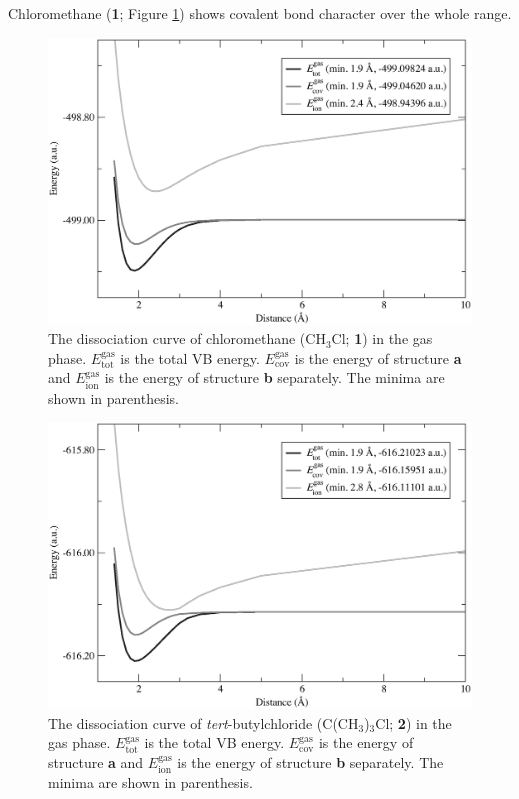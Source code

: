 Chloromethane (\textbf{1}; Figure \ref{ch3.fig.ch3cl}) shows covalent bond character over the whole range. 
\begin{figure}[htbp]
\begin{center}
\includegraphics[scale=0.55]{dissociation/figures/ch3cl_g.eps}
\end{center}
\caption{The dissociation curve of chloromethane (CH$_3$Cl; \textbf{1}) in the gas phase. $E_\mathrm{tot}^\mathrm{gas}$ is the total VB energy. $E_\mathrm{cov}^\mathrm{gas}$ is the energy of structure \textbf{a} and $E_\mathrm{ion}^\mathrm{gas}$ is the energy of structure \textbf{b} separately. The minima are shown in parenthesis.}
\label{ch3.fig.ch3cl}
\end{figure}
\begin{figure}[hbtp]
\begin{center}
\includegraphics[scale=0.55]{dissociation/figures/c4h9cl_g.eps}
\end{center}
\caption{The dissociation curve of \textit{tert}-butylchloride (C(CH$_3$)$_3$Cl; \textbf{2}) in the gas phase. $E_\mathrm{tot}^\mathrm{gas}$ is the total VB energy. $E_\mathrm{cov}^\mathrm{gas}$ is the energy of structure \textbf{a} and $E_\mathrm{ion}^\mathrm{gas}$ is the energy of structure \textbf{b} separately. The minima are shown in parenthesis.}
\label{ch3.fig.c4h9cl}
\end{figure}
